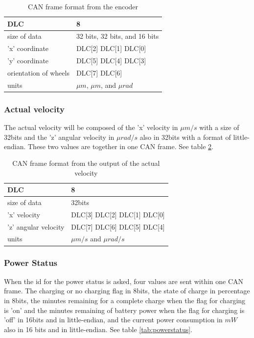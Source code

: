 \documentclass[12pt]{report}%
\begin{document}
\begin{table}[h!]
\centering
\begin{tabular}{|l|l|}
	\hline
	DLC										&	8																\\	\hline
	size of data					&	32 bits, 32 bits, and 16 bits		\\	\hline
	'x' coordinate				&	DLC[2] DLC[1] DLC[0] 						\\	\hline
	'y'	coordinate				&	DLC[5] DLC[4] DLC[3] 						\\	\hline
	orientation of wheels	&	DLC[7] DLC[6] 									\\	\hline
	units									&	$\mu m$, $\mu m$, and $\mu rad$	\\	\hline
\end{tabular}
\caption{\label{tab:encoder} CAN frame format from the encoder}
\end{table}

\subsubsection{Actual velocity}
The actual velocity will be composed of the 'x' velocity in $\mu m/s$ with a size of 32bits and the 'z' angular velocity in $\mu rad/s$ also in 32bits with a format of little-endian. These two values are together in one CAN frame. See table \ref{tab:velocity}.

\begin{table}[h!]
\centering
\begin{tabular}{|l|l|}
	\hline
	DLC										&	8														\\	\hline
	size of data					&	32bits											\\	\hline
	'x' velocity					&	DLC[3] DLC[2] DLC[1] DLC[0]	\\	\hline
	'z'	angular velocity	&	DLC[7] DLC[6] DLC[5] DLC[4]	\\	\hline
	units									&	$\mu m/s$ and $\mu rad/s$		\\	\hline
\end{tabular}
\caption{\label{tab:velocity} CAN frame format from the output of the actual velocity}
\end{table}

\subsubsection{Power Status}
When the id for the power status is asked, four values are sent within one CAN frame. The charging or no charging flag in 8bits, the state of charge in percentage in 8bits, the minutes remaining for a complete charge when the flag for charging is 'on' and the minutes remaining of battery power when the flag for charging is 'off' in 16bits and in little-endian, and the current power consumption in $mW$ also in 16 bits and in little-endian. See table \ref{tab:powerstatus}.
\end{document}
